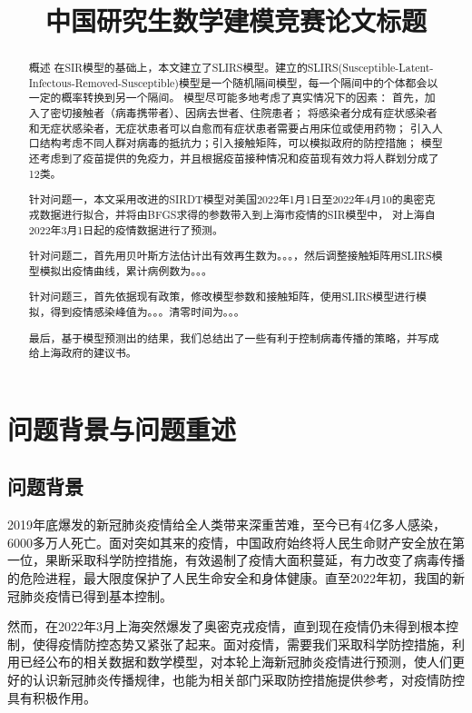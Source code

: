 \documentclass[bwprint]{gmcmthesis}
\title{中国研究生数学建模竞赛论文标题}
\numberwithin{figure}{section}
\begin{document}
 \maketitle
 \begin{abstract}
概述
在SIR模型的基础上，本文建立了SLIRS模型。建立的SLIRS(Susceptible-Latent-Infectous-Removed-Susceptible)模型是一个随机隔间模型，每一个隔间中的个体都会以一定的概率转换到另一个隔间。
模型尽可能多地考虑了真实情况下的因素：
首先，加入了密切接触者（病毒携带者）、因病去世者、住院患者；
将感染者分成有症状感染者和无症状感染者，无症状患者可以自愈而有症状患者需要占用床位或使用药物；
引入人口结构考虑不同人群对病毒的抵抗力；引入接触矩阵，可以模拟政府的防控措施；
模型还考虑到了疫苗提供的免疫力，并且根据疫苗接种情况和疫苗现有效力将人群划分成了12类。
\par 针对问题一，本文采用改进的SIRDT模型对美国2022年1月1日至2022年4月10的奥密克戎数据进行拟合，并将由BFGS求得的参数带入到上海市疫情的SIR模型中，
对上海自2022年3月1日起的疫情数据进行了预测。
\par 针对问题二，首先用贝叶斯方法估计出有效再生数为。。。，然后调整接触矩阵用SLIRS模型模拟出疫情曲线，累计病例数为。。。
\par 针对问题三，首先依据现有政策，修改模型参数和接触矩阵，使用SLIRS模型进行模拟，得到疫情感染峰值为。。。清零时间为。。。
\par 最后，基于模型预测出的结果，我们总结出了一些有利于控制病毒传播的策略，并写成给上海政府的建议书。



\end{abstract}


\tableofcontents

\section{问题背景与问题重述}
\subsection{问题背景}
2019年底爆发的新冠肺炎疫情给全人类带来深重苦难，至今已有4亿多人感染，6000多万人死亡。面对突如其来的疫情，中国政府始终将人民生命财产安全放在第一位，果断采取科学防控措施，有效遏制了疫情大面积蔓延，有力改变了病毒传播的危险进程，最大限度保护了人民生命安全和身体健康。直至2022年初，我国的新冠肺炎疫情已得到基本控制。
\par 然而，在2022年3月上海突然爆发了奥密克戎疫情，直到现在疫情仍未得到根本控制，使得疫情防控态势又紧张了起来。面对疫情，需要我们采取科学防控措施，利用已经公布的相关数据和数学模型，对本轮上海新冠肺炎疫情进行预测，使人们更好的认识新冠肺炎传播规律，也能为相关部门采取防控措施提供参考，对疫情防控具有积极作用。
\end{document}
